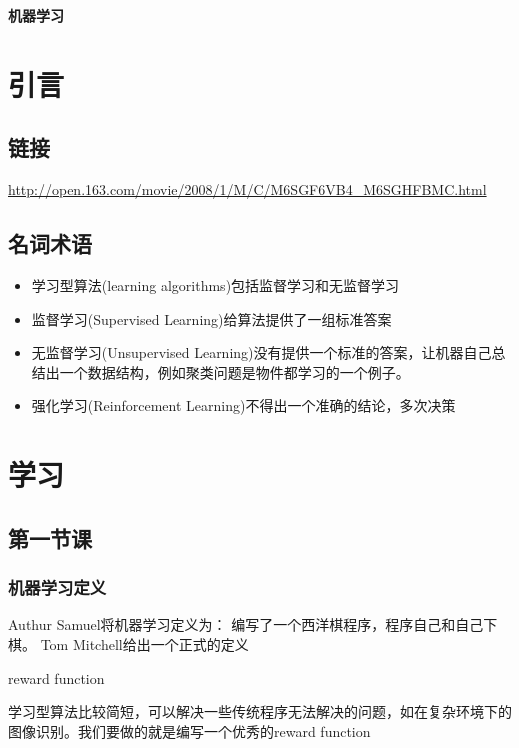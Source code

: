 \documentclass[a4paper,12pt]{ctexbook}
\begin{document}
\begin{center}
\huge \textbf{机器学习}
\end{center}

\tableofcontents
\newpage
\chapter{引言}
\section{链接}
\url{http://open.163.com/movie/2008/1/M/C/M6SGF6VB4_M6SGHFBMC.html}

\section{名词术语}
\begin{itemize}
  \item 学习型算法(learning algorithms)\-包括监督学习和无监督学习
  \item 监督学习(Supervised Learning)\-给算法提供了一组标准答案
  \item 无监督学习(Unsupervised Learning)\-没有提供一个标准的答案，让机器自己总结出一个数据结构，例如聚类问题是物件都学习的一个例子。
  \item 强化学习(Reinforcement Learning)\-不得出一个准确的结论，多次决策
\end{itemize}

\chapter{学习}
\section{第一节课}
\subsection{机器学习定义}
Authur Samuel将机器学习定义为：
编写了一个西洋棋程序，程序自己和自己下棋。
Tom Mitchell给出一个正式的定义

reward function

学习型算法比较简短，可以解决一些传统程序无法解决的问题，如在复杂环境下的图像识别。我们要做的就是编写一个优秀的reward function
\end{document}

